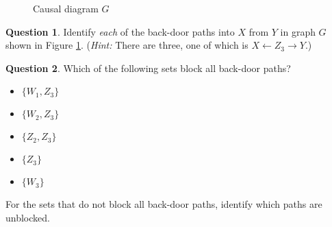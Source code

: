 \documentclass[11pt]{amsart}
\theoremstyle{definition}
\theoremstyle{question}
\newtheorem{question}{Question}
\begin{document}
\begin{figure}[h]
	\caption{Causal diagram $G$} \label{fig:causal}
    \centering
    

\end{figure}

\begin{question}
Identify \emph{each} of the back-door paths into $X$ from $Y$ in graph $G$ shown in Figure \ref{fig:causal}. (\emph{Hint:} There are three, one of which is $X \leftarrow Z_3 \rightarrow Y$.)
\end{question}

\begin{question}
Which of the following sets block all back-door paths?
	\begin{itemize}
		\item $\{ W_1, Z_3 \}$
		\item $\{ W_2, Z_3 \}$
		\item $\{ Z_2, Z_3 \}$
		\item $\{ Z_3 \}$
		\item $\{ W_3 \}$
	\end{itemize}
For the sets that do not block all back-door paths, identify which paths are unblocked.
\end{question}


\end{document}
